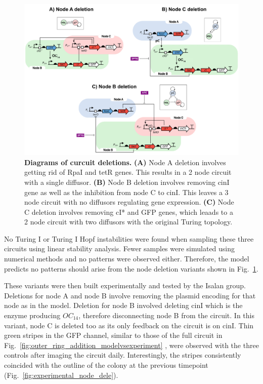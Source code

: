 \begin{figure}[H] %
    \centering
    \begin{adjustbox}{center}
        \includegraphics[width=1.1\textwidth]{chapters/Chapter 3/deletion_circuits} %
    \end{adjustbox}
    \caption{\textbf{Diagrams of curcuit deletions.} \textbf{(A)} Node A deletion involves getting rid of RpaI and tetR genes. This results in a 2 node circuit with a single diffusor. \textbf{(B)} Node B deletion involves removing cinI gene as well as the inhibition from node C to cinI. This leaves a 3 node circuit with no diffusors regulating gene expression. \textbf{(C)} Node C deletion involves removing cI* and GFP genes, which leaads to a 2 node circuit with two diffusors with the original Turing topology.}
    \label{fig:deletion_circuits} %
\end{figure}

No Turing I or Turing I Hopf instabilities were found when sampling these three circuits using linear stability analysis. %
Fewer samples were simulated using numerical methods and no patterns were observed either. %
Therefore, the model predicts no patterns should arise from the node deletion variants shown in Fig.~\ref{fig:deletion_circuits}.

These variants were then built experimentally and tested by the
Isalan group.
Deletions for node A and node B involve removing the plasmid encoding for that node as in the model.
Deletion for node B involved deleting cinI which is the enzyme producing $OC_{14}$, therefore disconnecting node B from the circuit.
In this variant, node C is deleted too as its only feedback on the circuit is on cinI.
Thin green stripes in the GFP channel, similar to those of the full circuit in Fig.~\ref{fig:outer_ring_addition_modelvsexperiment} , were observed with the three controls after imaging the circuit daily.
Interestingly, the stripes consistently coincided with the outline of the colony at the previous timepoint (Fig.~\ref{fig:experimental_node_dele}).

